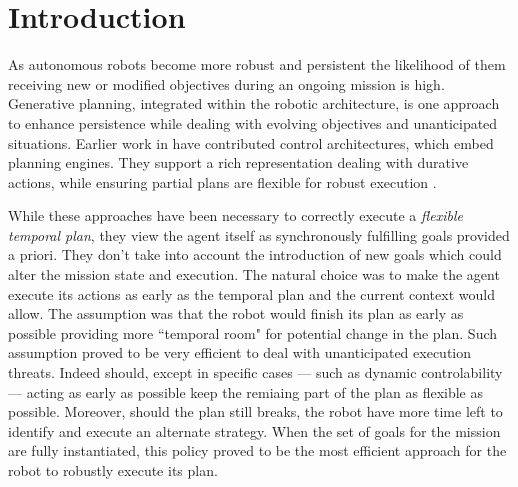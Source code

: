 \section{Introduction}
\label{sec:intro}

As autonomous robots become more robust and persistent the likelihood
of them receiving new or modified objectives during an ongoing
mission is high. Generative planning, integrated within the robotic
architecture, is one approach to enhance
persistence while dealing with evolving objectives and unanticipated situations.  Earlier work in
\cite{AmbrosIngerson88,Haigh98,alami:1998p820,mus98,chien99,mus04,py10}
have contributed control architectures, which embed planning engines.
They support a rich representation dealing with durative
actions, while ensuring partial plans are flexible for robust execution
\cite{lemai-chenevier2004}.


While these approaches have been necessary to correctly execute a
\emph{flexible temporal plan}, they view the agent itself as
synchronously fulfilling goals provided a priori. They don't take into account the
introduction of new goals which could alter the mission state and
execution.
The natural choice was to make the agent execute its actions as early
as the temporal plan and the current context would allow. The
assumption was that the robot would finish its plan as early as possible
providing more ``temporal room" for potential change in the plan. Such
assumption proved to be very efficient to deal with unanticipated
execution threats. Indeed should, except in specific cases  --- such as
dynamic controlability \cite{morris01} --- acting as early
as possible keep the remiaing part of the plan as flexible as
possible. Moreover, should the plan still breaks, the robot have more
time left to identify and execute an alternate strategy. When the set
of goals for the mission are fully instantiated, this policy proved to
be the most efficient approach for the robot to robustly execute its
plan. 

